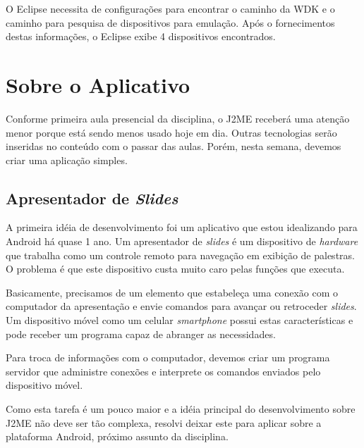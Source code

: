 \documentclass{article}
\begin{document}
O Eclipse necessita de configurações para encontrar o caminho da WDK e o caminho
para pesquisa de dispositivos para emulação. Após o fornecimentos destas
informações, o Eclipse exibe 4 dispositivos encontrados.

\section{Sobre o Aplicativo}
\label{sec:sobre}

Conforme primeira aula presencial da disciplina, o J2ME receberá uma atenção
menor porque está sendo menos usado hoje em dia. Outras tecnologias serão
inseridas no conteúdo com o passar das aulas. Porém, nesta semana, devemos criar
uma aplicação simples.

\subsection{Apresentador de \emph{Slides}}

A primeira idéia de desenvolvimento foi um aplicativo que estou idealizando para
Android há quase 1 ano. Um apresentador de \emph{slides} é um dispositivo de
\emph{hardware} que trabalha como um controle remoto para navegação em exibição
de palestras. O problema é que este dispositivo custa muito caro pelas funções
que executa.

Basicamente, precisamos de um elemento que estabeleça uma conexão com o
computador da apresentação e envie comandos para avançar ou retroceder
\emph{slides}. Um dispositivo móvel como um celular \emph{smartphone} possui
estas características e pode receber um programa capaz de abranger as
necessidades.

Para troca de informações com o computador, devemos criar um programa servidor
que administre conexões e interprete os comandos enviados pelo dispositivo
móvel.

Como esta tarefa é um pouco maior e a idéia principal do desenvolvimento sobre
J2ME não deve ser tão complexa, resolvi deixar este para aplicar sobre a
plataforma Android, próximo assunto da disciplina.
\end{document}
